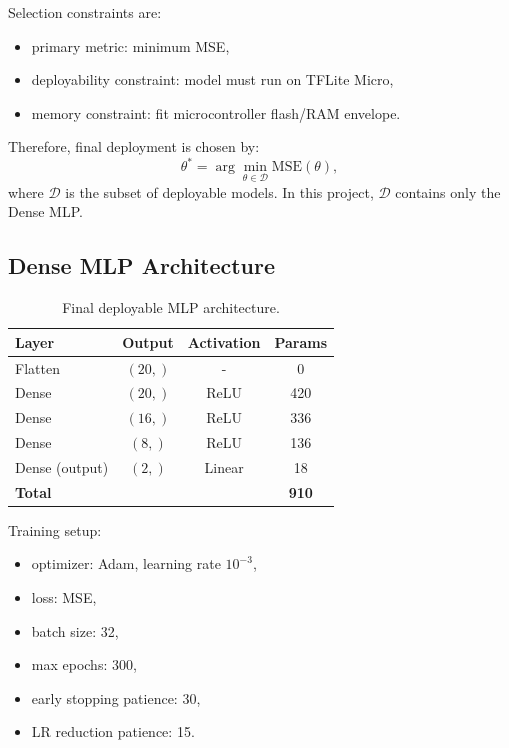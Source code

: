 Selection constraints are:
\begin{itemize}
    \item primary metric: minimum MSE,
    \item deployability constraint: model must run on TFLite Micro,
    \item memory constraint: fit microcontroller flash/RAM envelope.
\end{itemize}

Therefore, final deployment is chosen by:
\begin{equation}
\label{eq:deploy-choice}
\theta^* = \arg\min_{\theta \in \mathcal{D}} \text{MSE}(\theta),
\end{equation}
where $\mathcal{D}$ is the subset of deployable models.
In this project, $\mathcal{D}$ contains only the Dense MLP.

\subsection{Dense MLP Architecture}
\label{sec:tinyml-mlp}

\begin{table}[H]
\centering
\caption{Final deployable MLP architecture.}
\label{tab:model-dense}
\renewcommand{\arraystretch}{1.25}
\begin{tabular}{l c c c}
    \toprule
    \textbf{Layer} & \textbf{Output} & \textbf{Activation} & \textbf{Params} \\
    \midrule
    Flatten         & $(20,)$ & -      & 0   \\
    Dense           & $(20,)$ & ReLU   & 420 \\
    Dense           & $(16,)$ & ReLU   & 336 \\
    Dense           & $(8,)$  & ReLU   & 136 \\
    Dense (output)  & $(2,)$  & Linear & 18  \\
    \midrule
    \multicolumn{3}{l}{\textbf{Total}} & \textbf{910} \\
    \bottomrule
\end{tabular}
\end{table}

Training setup:
\begin{itemize}
    \item optimizer: Adam, learning rate $10^{-3}$,
    \item loss: MSE,
    \item batch size: 32,
    \item max epochs: 300,
    \item early stopping patience: 30,
    \item LR reduction patience: 15.
\end{itemize}

